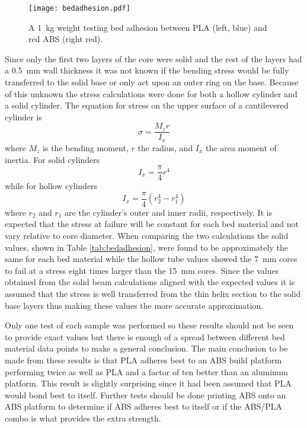 \documentclass[main.tex]{subfiles}
\begin{document}
\begin{wrapfigure}{R}{0.4\textwidth}
\centering
	\texttt{[image: bedadhesion.pdf]}
	\caption{A \SI{1}{kg} weight testing bed adhesion between PLA (left, blue) and red ABS (right red).\\}
	\label{fig:bedadhesion}
\end{wrapfigure}

Since only the first two layers of the core were solid and the rest of the layers had a \SI{0.5}{mm} wall thickness it was not known if the bending stress would be fully transferred to the solid base or only act upon an outer ring on the base.
Because of this unknown the stress calculations were done for both a hollow cylinder and a solid cylinder.
The equation for stress on the upper surface of a cantilevered cylinder is
\begin{equation}
\sigma = \frac{M_z r}{I_x}
\label{eq:stress}
\end{equation}
where $M_z$ is the bending moment, $r$ the radius, and $I_x$ the area moment of inertia.
For solid cylinders
\begin{equation}
I_x = \frac{\pi}{4}r^4
\label{eq:IxSolid}
\end{equation}
while for hollow cylinders
\begin{equation}
I_x = \frac{\pi}{4}\left(r_2^4-r_1^4\right)
\end{equation}
where $r_2$ and $r_1$ are the cylinder's outer and inner radii, respectively.%
%
%
It is expected that the stress at failure will be constant for each bed material and not vary relative to core diameter.
When comparing the two calculations the solid values, shown in Table \ref{tab:bedadhesion}, were found to be approximately the same for each bed material while the hollow tube values showed the \SI{7}{mm} cores to fail at a stress eight times larger than the \SI{15}{mm} cores.
Since the values obtained from the solid beam calculations aligned with the expected values it is assumed that the stress is well transferred from the thin helix section to the solid base layers thus making these values the more accurate approximation.

Only one test of each sample was performed so these results should not be seen to provide exact values but there is enough of a spread between different bed material data points to make a general conclusion.
The main conclusion to be made from these results is that PLA adheres best to an ABS build platform performing twice as well as PLA and a factor of ten better than an aluminum platform.
This result is slightly surprising since it had been assumed that PLA would bond best to itself.
Further tests should be done printing ABS onto an ABS platform to determine if ABS adheres best to itself or if the ABS/PLA combo is what provides the extra strength.
\end{document}
